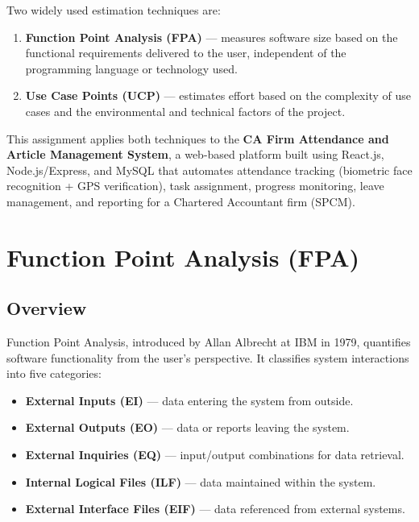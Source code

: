 \documentclass[12pt,a4paper]{article}
\begin{document}
Two widely used estimation techniques are:
\begin{enumerate}[noitemsep, label=\roman*)]
    \item \textbf{Function Point Analysis (FPA)} --- measures software size based on the functional requirements delivered to the user, independent of the programming language or technology used.
    \item \textbf{Use Case Points (UCP)} --- estimates effort based on the complexity of use cases and the environmental and technical factors of the project.
\end{enumerate}

This assignment applies both techniques to the \textbf{CA Firm Attendance and Article Management System}, a web-based platform built using React.js, Node.js/Express, and MySQL that automates attendance tracking (biometric face recognition + GPS verification), task assignment, progress monitoring, leave management, and reporting for a Chartered Accountant firm (SPCM).

\section{Function Point Analysis (FPA)}

\subsection{Overview}
Function Point Analysis, introduced by Allan Albrecht at IBM in 1979, quantifies software functionality from the user's perspective. It classifies system interactions into five categories:
\begin{itemize}[noitemsep]
    \item \textbf{External Inputs (EI)} --- data entering the system from outside.
    \item \textbf{External Outputs (EO)} --- data or reports leaving the system.
    \item \textbf{External Inquiries (EQ)} --- input/output combinations for data retrieval.
    \item \textbf{Internal Logical Files (ILF)} --- data maintained within the system.
    \item \textbf{External Interface Files (EIF)} --- data referenced from external systems.
\end{itemize}
\end{document}
